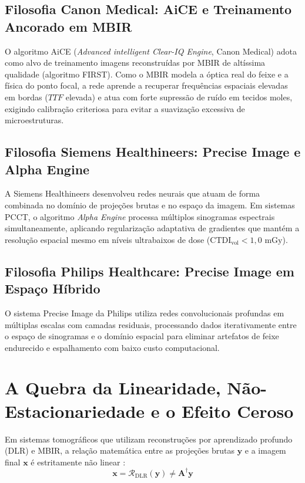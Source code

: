 \subsection{Filosofia Canon Medical: AiCE e Treinamento Ancorado em MBIR}
O algoritmo AiCE (\emph{Advanced intelligent Clear-IQ Engine}, Canon Medical) adota como alvo de treinamento imagens reconstruídas por MBIR de altíssima qualidade (algoritmo FIRST). Como o MBIR modela a óptica real do feixe e a física do ponto focal, a rede aprende a recuperar frequências espaciais elevadas em bordas ($TTF$ elevada) e atua com forte supressão de ruído em tecidos moles, exigindo calibração criteriosa para evitar a suavização excessiva de microestruturas.

\subsection{Filosofia Siemens Healthineers: Precise Image e Alpha Engine}
A Siemens Healthineers desenvolveu redes neurais que atuam de forma combinada no domínio de projeções brutas e no espaço da imagem. Em sistemas PCCT, o algoritmo \emph{Alpha Engine} processa múltiplos sinogramas espectrais simultaneamente, aplicando regularização adaptativa de gradientes que mantém a resolução espacial mesmo em níveis ultrabaixos de dose ($\text{CTDI}_{\text{vol}} < 1{,}0\text{ mGy}$).

\subsection{Filosofia Philips Healthcare: Precise Image em Espaço Híbrido}
O sistema Precise Image da Philips utiliza redes convolucionais profundas em múltiplas escalas com camadas residuais, processando dados iterativamente entre o espaço de sinogramas e o domínio espacial para eliminar artefatos de feixe endurecido e espalhamento com baixo custo computacional.

\section{A Quebra da Linearidade, Não-Estacionariedade e o Efeito Ceroso}
\label{sec:quebra_linearidade}

Em sistemas tomográficos que utilizam reconstruções por aprendizado profundo (DLR) e MBIR, a relação matemática entre as projeções brutas $\mathbf{y}$ e a imagem final $\mathbf{x}$ é estritamente não linear \cite{greffier2026, debbiche2024}:
\begin{equation}
  \mathbf{x} = \mathcal{R}_{\text{DLR}}(\mathbf{y}) \ne \mathbf{A}^\dagger \mathbf{y}
  \label{eq:nao_linear_dlr}
\end{equation}

